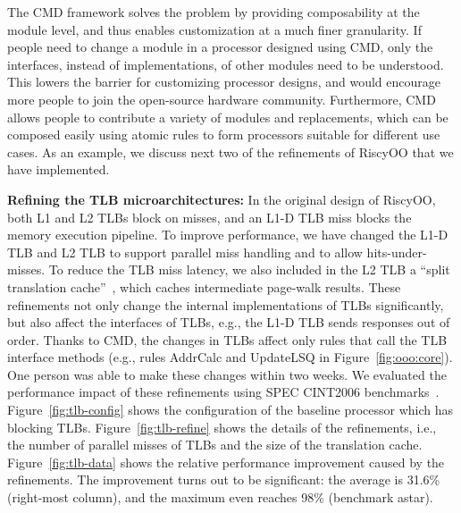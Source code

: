 \documentclass[conference]{IEEEtran}
\begin{document}
The CMD framework solves the problem by providing composability at the module level, and thus enables customization at a much finer granularity.
If people need to change a module in a processor designed using CMD, only the interfaces, instead of implementations, of other modules need to be understood.
This lowers the barrier for customizing processor designs, and would encourage more people to join the open-source hardware community.
Furthermore, CMD allows people to contribute a variety of modules and replacements, which can be composed easily using atomic rules to form processors suitable for different use cases.
As an example, we discuss next two of the refinements of RiscyOO that we have implemented. 

\noindent\textbf{Refining the TLB microarchitectures:}
In the original design of RiscyOO, both L1 and L2 TLBs block on misses, and an L1-D TLB miss blocks the memory execution pipeline.
To improve performance, we have changed the L1-D TLB and L2 TLB to support parallel miss handling and to allow hits-under-misses.
To reduce the TLB miss latency, we also included in the L2 TLB a ``split translation cache''~\cite{translationCache}, which caches intermediate page-walk results.
These refinements not only change the internal implementations of TLBs significantly, but also affect the interfaces of TLBs, e.g., the L1-D TLB sends responses out of order.
Thanks to CMD, the changes in TLBs affect only rules that call the TLB interface methods (e.g., rules AddrCalc and UpdateLSQ in Figure~\ref{fig:ooo:core}). One person was able to make these  changes within two weeks.
We evaluated the performance impact of these refinements using SPEC CINT2006 benchmarks~\cite{riscyoo}.
Figure~\ref{fig:tlb-config} shows the configuration of the baseline processor which has blocking TLBs.
Figure~\ref{fig:tlb-refine} shows the details of the refinements, i.e., the number of parallel misses of TLBs and the size of the translation cache.
Figure~\ref{fig:tlb-data} shows the relative performance improvement caused by the refinements.
The improvement turns out to be significant: the average is 31.6\% (right-most column), and the maximum even reaches 98\% (benchmark astar).
\end{document}
